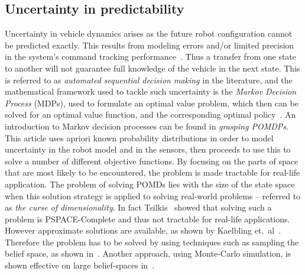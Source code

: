 \subsection{Uncertainty in predictability}
Uncertainty in vehicle dynamics arises as the future robot configuration cannot
be predicted exactly. This results from modeling errors and/or limited precision
in the system's command tracking
performance~\cite{dadkhahSurveyMotionPlanning2012}. Thus a transfer from one
state to another will not guarantee full knowledge of the vehicle in the next
state. This is referred to as \textit{automated sequential decision making} in
the literature, and the mathematical framework used to tackle such uncertainty
is the \textit{Markov Decision Process} (MDPs), used to formulate an optimal
value problem, which then can be solved for an optimal value function, and the
corresponding optimal policy~\cite{Cassandra:1998:EAA:926710}. An introduction
to Markov decision processes can be found in \textit{grasping
  POMDPs}\cite{kaelblingPlanningActingPartially1998}. This article uses apriori
known probability distributions in order to model uncertainty in the robot model
and in the sensors, then proceeds to use this to solve a number of different
objective functions. By focusing on the parts of space that are most likely to
be encountered, the problem is made tractable for real-life application. The
problem of solving POMDs lies with the size of the state space when this
solution strategy is applied to solving real-world problems -- referred to as
\textit{the curse of dimensionality}. In fact
Tsilkis~\cite{christosh.papadimitriouComplexityMarkovDecision1987} showed that
solving such a problem is PSPACE-Complete and thus not tractable for real-life
applications. However approximate solutions are available, as shown by Kaelbling
et.\ al~\cite{kaelblingPlanningActingPartially1998}. Therefore the problem has
to be solved by using techniques such as sampling the belief space, as shown
in~\cite{kearns2002sparse}. Another approach, using Monte-Carlo simulation, is
shown effective on large belief-spaces in~\cite{Veness_2011}.


